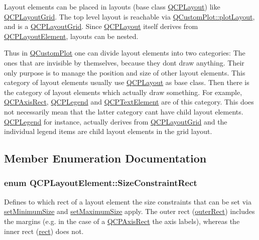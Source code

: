 Layout elements can be placed in layouts (base class \hyperlink{classQCPLayout}{Q\+C\+P\+Layout}) like \hyperlink{classQCPLayoutGrid}{Q\+C\+P\+Layout\+Grid}. The top level layout is reachable via \hyperlink{classQCustomPlot_afd280d4d621ae64a106543a545c508d7}{Q\+Custom\+Plot\+::plot\+Layout}, and is a \hyperlink{classQCPLayoutGrid}{Q\+C\+P\+Layout\+Grid}. Since \hyperlink{classQCPLayout}{Q\+C\+P\+Layout} itself derives from \hyperlink{classQCPLayoutElement}{Q\+C\+P\+Layout\+Element}, layouts can be nested.

Thus in \hyperlink{classQCustomPlot}{Q\+Custom\+Plot} one can divide layout elements into two categories\+: The ones that are invisible by themselves, because they don\textquotesingle{}t draw anything. Their only purpose is to manage the position and size of other layout elements. This category of layout elements usually use \hyperlink{classQCPLayout}{Q\+C\+P\+Layout} as base class. Then there is the category of layout elements which actually draw something. For example, \hyperlink{classQCPAxisRect}{Q\+C\+P\+Axis\+Rect}, \hyperlink{classQCPLegend}{Q\+C\+P\+Legend} and \hyperlink{classQCPTextElement}{Q\+C\+P\+Text\+Element} are of this category. This does not necessarily mean that the latter category can\textquotesingle{}t have child layout elements. \hyperlink{classQCPLegend}{Q\+C\+P\+Legend} for instance, actually derives from \hyperlink{classQCPLayoutGrid}{Q\+C\+P\+Layout\+Grid} and the individual legend items are child layout elements in the grid layout. 

\subsection{Member Enumeration Documentation}
\subsubsection[{\texorpdfstring{Size\+Constraint\+Rect}{SizeConstraintRect}}]{\setlength{\rightskip}{0pt plus 5cm}enum {\bf Q\+C\+P\+Layout\+Element\+::\+Size\+Constraint\+Rect}}\hypertarget{classQCPLayoutElement_a0afb3e5773529e4bd20e448f81be4d2a}{}\label{classQCPLayoutElement_a0afb3e5773529e4bd20e448f81be4d2a}
Defines to which rect of a layout element the size constraints that can be set via \hyperlink{classQCPLayoutElement_a5dd29a3c8bc88440c97c06b67be7886b}{set\+Minimum\+Size} and \hyperlink{classQCPLayoutElement_a74eb5280a737ab44833d506db65efd95}{set\+Maximum\+Size} apply. The outer rect (\hyperlink{classQCPLayoutElement_a60bbddee2d1230c2414bd776f44d17b8}{outer\+Rect}) includes the margins (e.\+g. in the case of a \hyperlink{classQCPAxisRect}{Q\+C\+P\+Axis\+Rect} the axis labels), whereas the inner rect (\hyperlink{classQCPLayoutElement_affdfea003469aac3d0fac5f4e06171bc}{rect}) does not.

